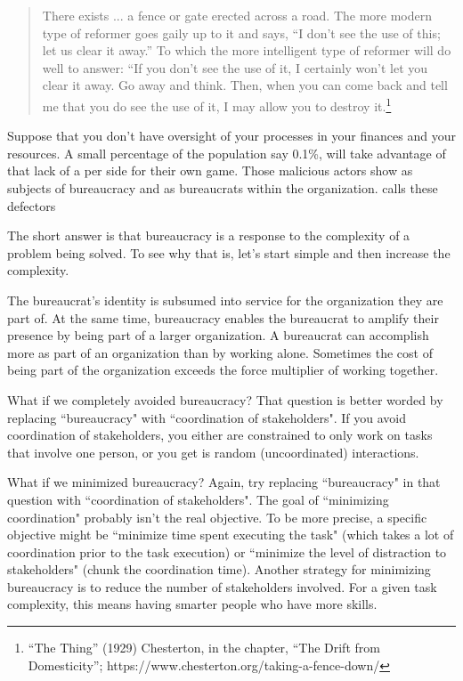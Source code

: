 \begin{quote}
There exists ... a fence or gate erected across a road. The more modern type of reformer goes gaily up to it and says, “I don’t see the use of this; let us clear it away.” To which the more intelligent type of reformer will do well to answer: “If you don’t see the use of it, I certainly won’t let you clear it away. Go away and think. Then, when you can come back and tell me that you do see the use of it, I may allow you to destroy it.\footnote{``The Thing'' (1929) Chesterton, in the chapter, “The Drift from Domesticity”; https://www.chesterton.org/taking-a-fence-down/}
\end{quote}

Suppose that you don't have oversight of your processes in your finances and your resources. A small percentage of the population say 0.1\%, will take advantage of that lack of a per side for their own game. Those malicious actors show as subjects of bureaucracy and as bureaucrats within the organization. 
\cite{2012_Schneier} calls these defectors



The short answer is that bureaucracy is a response to the complexity of a problem being solved. To see why that is, let's start simple and then increase the complexity. 



The bureaucrat's identity is subsumed into service for the organization they are part of. At the same time, bureaucracy enables the bureaucrat to amplify their presence by being part of a larger organization. A bureaucrat can accomplish more as part of an organization than by working alone. Sometimes the cost of being part of the organization exceeds the force multiplier of working together. 


What if we completely avoided bureaucracy? That question is better worded by replacing ``bureaucracy" with ``coordination of stakeholders". If you avoid coordination of stakeholders, you either are constrained to only work on tasks that involve one person, or you get is random (uncoordinated) interactions. 

What if we minimized bureaucracy? Again, try replacing ``bureaucracy" in that question with ``coordination of stakeholders". The goal of ``minimizing coordination" probably isn't the real objective. To be more precise, a specific objective might be ``minimize time spent executing the task" (which takes a lot of coordination prior to the task execution) or ``minimize the level of distraction to stakeholders" (chunk the coordination time). Another strategy for minimizing bureaucracy is to reduce the number of stakeholders involved. For a given task complexity, this means having smarter people who have more skills. 

